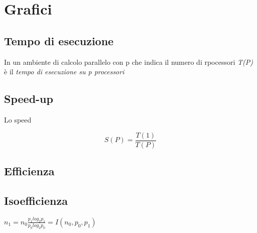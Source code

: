 \documentclass{article}
\begin{document}
\section{Grafici}
\subsection{Tempo di esecuzione}

In un ambiente di calcolo parallelo con p che indica il numero di rpocessori \textit{T(P)} è il \textit{tempo di esecuzione su p processori}


\subsection{Speed-up}
Lo speed

$$ S(P) = \frac{T(1)}{T(P)} $$

\subsection{Efficienza}
\subsection{Isoefficienza}


$n_1 = n_0\frac{p_{1} log_{2} p_{1}}{p_{0} log_{2} p_{0}} = I(n_{0}, p_{0}, p_{1})$
\end{document}
